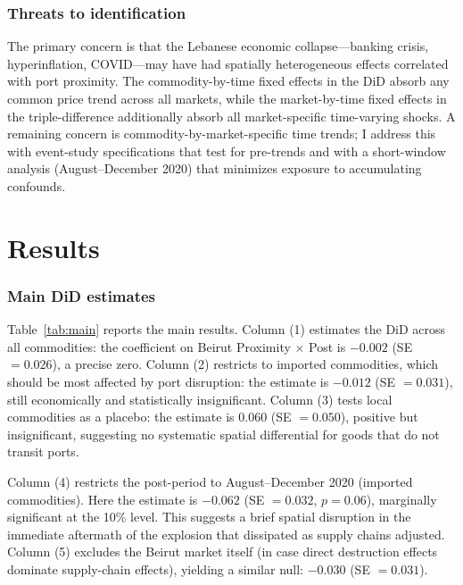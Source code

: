 \documentclass[12pt]{article}
\begin{document}
\subsubsection*{Threats to identification} The primary concern is that the Lebanese economic collapse---banking crisis, hyperinflation, COVID---may have had spatially heterogeneous effects correlated with port proximity. The commodity-by-time fixed effects in the DiD absorb any common price trend across all markets, while the market-by-time fixed effects in the triple-difference additionally absorb all market-specific time-varying shocks. A remaining concern is commodity-by-market-specific time trends; I address this with event-study specifications that test for pre-trends and with a short-window analysis (August--December 2020) that minimizes exposure to accumulating confounds.

\section{Results}\label{sec:results}

\subsubsection*{Main DiD estimates} Table~\ref{tab:main} reports the main results. Column (1) estimates the DiD across all commodities: the coefficient on Beirut Proximity $\times$ Post is $-0.002$ (SE $= 0.026$), a precise zero. Column (2) restricts to imported commodities, which should be most affected by port disruption: the estimate is $-0.012$ (SE $= 0.031$), still economically and statistically insignificant. Column (3) tests local commodities as a placebo: the estimate is $0.060$ (SE $= 0.050$), positive but insignificant, suggesting no systematic spatial differential for goods that do not transit ports.

Column (4) restricts the post-period to August--December 2020 (imported commodities). Here the estimate is $-0.062$ (SE $= 0.032$, $p = 0.06$), marginally significant at the 10\% level. This suggests a brief spatial disruption in the immediate aftermath of the explosion that dissipated as supply chains adjusted. Column (5) excludes the Beirut market itself (in case direct destruction effects dominate supply-chain effects), yielding a similar null: $-0.030$ (SE $= 0.031$).


\end{document}
